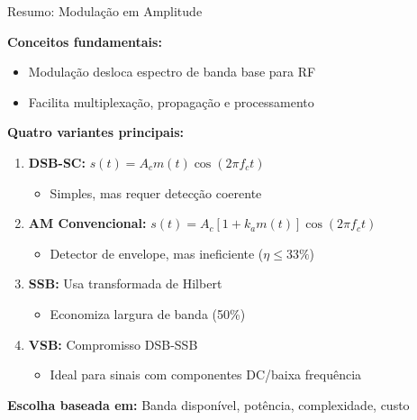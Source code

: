 
\begin{frame}{Resumo: Modulação em Amplitude}

\textbf{Conceitos fundamentais:}
\begin{itemize}
\item Modulação desloca espectro de banda base para RF
\item Facilita multiplexação, propagação e processamento
\end{itemize}

\vspace{0.3cm}

\textbf{Quatro variantes principais:}

\begin{enumerate}
\item \textbf{DSB-SC:} $s(t) = A_c m(t)\cos(2\pi f_c t)$
   \begin{itemize}
   \item Simples, mas requer detecção coerente
   \end{itemize}

\item \textbf{AM Convencional:} $s(t) = A_c[1 + k_a m(t)]\cos(2\pi f_c t)$
   \begin{itemize}
   \item Detector de envelope, mas ineficiente ($\eta \leq 33\%$)
   \end{itemize}

\item \textbf{SSB:} Usa transformada de Hilbert
   \begin{itemize}
   \item Economiza largura de banda (50\%)
   \end{itemize}

\item \textbf{VSB:} Compromisso DSB-SSB
   \begin{itemize}
   \item Ideal para sinais com componentes DC/baixa frequência
   \end{itemize}
\end{enumerate}

\textbf{Escolha baseada em:} Banda disponível, potência, complexidade, custo

\end{frame}
